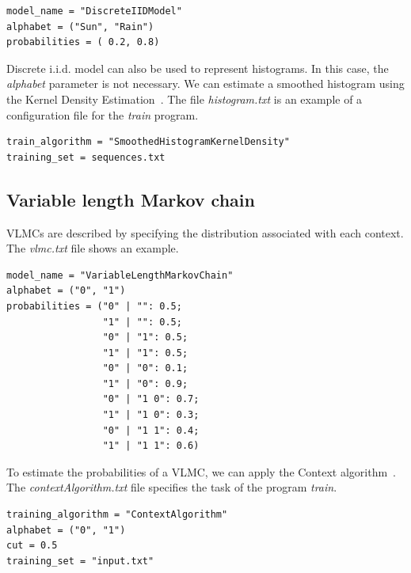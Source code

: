 \documentclass[10pt]{article}
\begin{document}
\begin{Verbatim}[frame=single,  label={fdd.txt}]
model_name = "DiscreteIIDModel"
alphabet = ("Sun", "Rain")
probabilities = ( 0.2, 0.8)
\end{Verbatim}

Discrete i.i.d. model can also be used to represent histograms. In this case, the \textit{alphabet} parameter is not necessary. We can estimate a smoothed histogram using the  Kernel Density Estimation~\cite{Sheather2004}. The file \textit{histogram.txt} is an example of a configuration file for the \textit{train} program.

\begin{Verbatim}[frame=single,  label={histogram.txt}]
train_algorithm = "SmoothedHistogramKernelDensity"
training_set = sequences.txt
\end{Verbatim}

\subsection*{Variable length Markov chain}

VLMCs are described by specifying  the distribution associated with each context. The  \textit{vlmc.txt} file shows an example.

\vspace{1em}
\begin{minipage}{\textwidth}
\begin{Verbatim}[frame=single,  label={vlmc.txt}]
model_name = "VariableLengthMarkovChain"
alphabet = ("0", "1")
probabilities = ("0" | "": 0.5;
                 "1" | "": 0.5;
                 "0" | "1": 0.5;
                 "1" | "1": 0.5;
                 "0" | "0": 0.1;
                 "1" | "0": 0.9;
                 "0" | "1 0": 0.7;
                 "1" | "1 0": 0.3;
                 "0" | "1 1": 0.4;
                 "1" | "1 1": 0.6)
\end{Verbatim}
\end{minipage}
\vspace{1em}

To estimate the probabilities of a VLMC, we can apply the Context algorithm~\cite{Galves2008}. The \textit{contextAlgorithm.txt} file specifies the task of the program \textit{train}.

\vspace{1em}
\begin{minipage}{\textwidth}
\begin{Verbatim}[frame=single,  label={contextAlgorithm.txt}]
training_algorithm = "ContextAlgorithm"
alphabet = ("0", "1")
cut = 0.5
training_set = "input.txt"
\end{Verbatim}
\end{minipage}
\vspace{1em}
\end{document}
